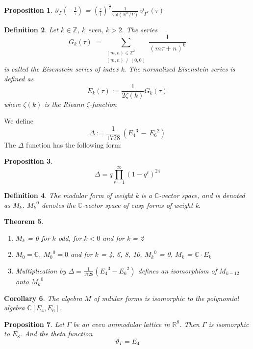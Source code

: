 \documentclass{article}
\newtheorem{theorem}{Theorem}[section]
\newtheorem{definition}[theorem]{Definition}
\newtheorem{collary}[theorem]{Corollary}
\newtheorem{prop}[theorem]{Proposition}
\numberwithin{equation}{theorem}
\numberwithin{figure}{theorem}
\newcommand{\thetaFunction}[1]{\ensuremath{\vartheta_{#1}}}
\newcommand{\modularK}[1]{\ensuremath{M_{#1}}}
\newcommand{\eisenSeries}[1]{\ensuremath{E_{#1}}}
\newcommand{\Integer}{\ensuremath{\mathbb{Z}}}
\newcommand{\Real}{\ensuremath{\mathbb{R}}}
\newcommand{\Complex}{\ensuremath{\mathbb{C}}}
\begin{document}
\begin{prop}\label{latticeAndDualThetaProp}
	$\thetaFunction{\Gamma}(-\frac{1}{\tau})$ = $(\frac{\tau}{i})^{\frac{n}{2}} \frac{1}{\mbox{vol}(\,\Real^n/\Gamma)}\,\thetaFunction{\Gamma^{*}}(\tau)$
\end{prop}
\begin{definition}
Let $k \in \Integer$, $k$ even, $k > 2.$ The series
\[
	G_k(\tau) \; = \sum_{\substack{(m,n) \in \Integer^2\\				 (m,n) \neq (0,0)}} \frac{1}{(m\tau + n)^k}
\]
is called the \emph{Eisenstein series of index k}.
The \emph{normalized Eisenstein series} is defined as
\[
	\eisenSeries{k}(\tau) := \frac{1}{2\zeta(k)} G_k(\tau)
\]
where $\zeta(k)$ is the \emph{Rieann $\zeta$-function}
\end{definition}
We define
\[
	\Delta := \frac{1}{1728}\,(\eisenSeries{4}^3 \, - \, \eisenSeries{6}^2) 
\]
The $\Delta$ function has the following form:
\begin{prop}\label{deltaExpansionProp}
\[
	\Delta = q \prod_{r = 1}^{\infty}(1 - q^r)^{24}
\]
\end{prop}
\begin{definition}
	The modular form of weight k is a $\Complex$-vector space, and is denoted as {\modularK{k}}. $\modularK{k}^0$ denotes the $\Complex$-vector space of cusp forms of weight k.
\end{definition}
\begin{theorem}\label{cuspFormTheo}\hfill
\begin{enumerate}
	\item $\modularK{k}$ = 0 for $k$ odd, for $k < 0$ and for k = 2
	\item $\modularK{0} = \Complex$, $\modularK{0}^0 = 0$ and for $k$ = 4, 6, 8, 10, $\modularK{k}^0 $ = 0, $\modularK{k}$ = $\Complex \cdot \eisenSeries{k}$\
	\item Multiplication by $\Delta = \frac{1}{1728}(\eisenSeries{4}^3 -\eisenSeries{6}^2)$ defines an isomorphism of $\modularK{k-12}$ onto $\modularK{k}^0$
\end{enumerate}
\end{theorem}
\begin{collary}\label{E4E6collary}
The algebra $M$ of mdular forms is isomorphic to the polynomial algebra $\Complex[{\eisenSeries{4}}, {\eisenSeries{6}}]$.
\end{collary}
\begin{prop}\label{E8isomorphProp}
Let $\Gamma$ be an even unimodular lattice in $\Real^8$. Then
$\Gamma$ is isomorphic to $E_8$. And the theta function 
\[
	\thetaFunction{\Gamma} = E_4
\]
\end{prop}
\end{document}
